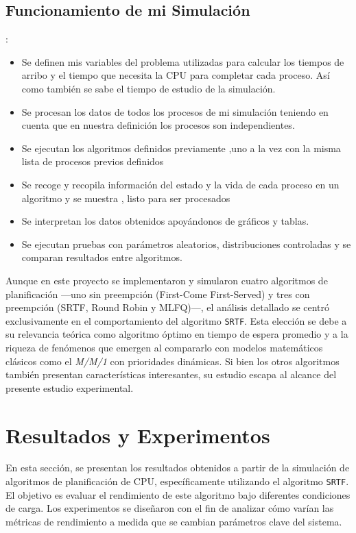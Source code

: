 \documentclass[12pt]{article}
\begin{document}
\subsection{Funcionamiento de mi Simulaci\'on}:

\begin{itemize}
	\item Se definen mis variables del problema utilizadas para calcular los tiempos de arribo y el tiempo que necesita la CPU para completar cada proceso. As\'i como tambi\'en se sabe el tiempo de estudio de la simulaci\'on.
	\item Se procesan los datos de todos los procesos de mi simulaci\'on teniendo en cuenta que en nuestra definici\'on los procesos son independientes. 
	\item Se ejecutan los algoritmos definidos previamente ,uno a la vez con la misma lista de procesos previos definidos
	\item Se recoge y recopila informaci\'on del estado y la vida de cada proceso en un algoritmo y se muestra , listo para ser procesados
	\item Se interpretan los datos obtenidos apoy\'andonos de gr\'aficos y tablas.
	\item Se ejecutan pruebas con parámetros aleatorios, distribuciones controladas y se comparan resultados entre algoritmos.
	
\end{itemize}

	
	Aunque en este proyecto se implementaron y simularon cuatro algoritmos de planificación —uno sin preempción (First-Come First-Served) y tres con preempción (SRTF, Round Robin y MLFQ)—, el análisis detallado se centró exclusivamente en el comportamiento del algoritmo \texttt{SRTF}. Esta elección se debe a su relevancia teórica como algoritmo óptimo en tiempo de espera promedio y a la riqueza de fenómenos que emergen al compararlo con modelos matemáticos clásicos como el \textit{M/M/1} con prioridades dinámicas. Si bien los otros algoritmos también presentan características interesantes, su estudio escapa al alcance del presente estudio experimental.
	
	
	
	\section{Resultados y Experimentos}
	
En esta sección, se presentan los resultados obtenidos a partir de la simulación de algoritmos de planificación de CPU, específicamente utilizando el algoritmo \texttt{SRTF}. El objetivo es evaluar el rendimiento de este algoritmo bajo diferentes condiciones de carga. Los experimentos se diseñaron con el fin de analizar cómo varían las métricas de rendimiento a medida que se cambian parámetros clave del sistema.
\end{document}
